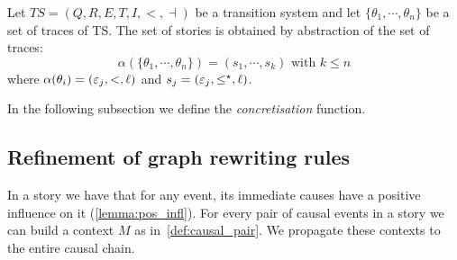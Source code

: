 \begin{definition}
  Let $TS = (Q,R,E,T,I,<,\dashv)$ be a transition system and let $\{\theta_1,\cdots,\theta_n\}$ be a set of traces of TS.
  The set of stories is obtained by abstraction of the set of traces:
  \[
  \alpha(\{\theta_1,\cdots,\theta_n\}) = (s_1,\cdots, s_k)\text{ with }k\leq n
  \]
  where $\alpha(\theta_i) = (\varepsilon_j,<,\ell)$ and $s_j = (\varepsilon_j,\leq^{\star},\ell)$.
\end{definition}



In the following subsection we define the \emph{concretisation} function.

\subsection{Refinement of graph rewriting rules}

In a story we have that for any event, its immediate causes have a positive influence on it (\autoref{lemma:pos_infl}). For every pair of causal events in a story we can build a context $M$ as in~\autoref{def:causal_pair}. We propagate these contexts to the entire causal chain.

